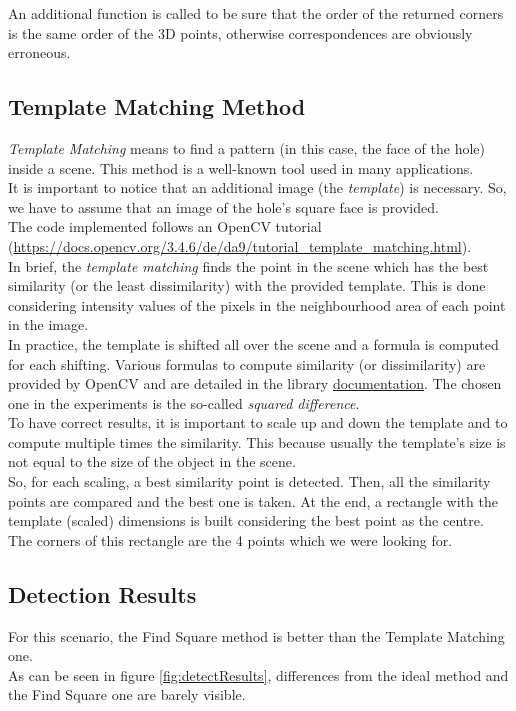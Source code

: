An additional function is called to be sure that the order of the returned corners is the same order of the 3D points, otherwise correspondences are obviously erroneous.	


\subsection{Template Matching Method}
\label{subsec:templateMatch}
\textit{Template Matching} means to find a pattern (in this case, the face of the hole) inside a scene. This method is a well-known tool used in many applications.\\

It is important to notice that an additional image (the \textit{template}) is necessary. So, we have to assume that an image of the hole's square face is provided.\\

The code implemented follows an OpenCV tutorial (\url{https://docs.opencv.org/3.4.6/de/da9/tutorial\_template\_matching.html}).\\
In brief, the \textit{template matching} finds the point in the scene which has the best similarity (or the least dissimilarity) with the provided template. This is done considering intensity values of the pixels in the neighbourhood area of each point in the image.\\
In practice, the template is shifted all over the scene and a formula is computed for each shifting. Various formulas to compute similarity (or dissimilarity) are provided by OpenCV and are detailed in the library \href{https://docs.opencv.org/master/df/dfb/group__imgproc__object.html#gga3a7850640f1fe1f58fe91a2d7583695dab65c042ed62c9e9e095a1e7e41fe2773}{documentation}. The chosen one in the experiments is the so-called \textit{squared difference}.\\

To have correct results, it is important to scale up and down the template and to compute multiple times the similarity. This because usually the template's size is not equal to the size of the object in the scene.\\
So, for each scaling, a best similarity point is detected. Then, all the similarity points are compared and the best one is taken. At the end, a rectangle with the template (scaled) dimensions is built considering the best point as the centre. The corners of this rectangle are the 4 points which we were looking for.

\subsection{Detection Results}
\label{subsec:detectResult}
For this scenario, the Find Square method is better than the Template Matching one.\\
As can be seen in figure \ref{fig:detectResults}, differences from the ideal method and the Find Square one are barely visible.\\

